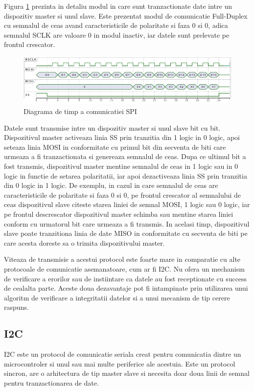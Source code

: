 Figura \ref{fig:SPITimingDiagram} prezinta in detaliu modul in care sunt tranzactionate date intre un dispozitiv master si unul slave. Este prezentat modul de 
comunicatie Full-Duplex cu semnalul de ceas avand caracteristicile de polaritate si faza 0 si 0, adica semnalul SCLK are valoare 0 in modul inactiv, iar datele 
sunt prelevate pe frontul crescator.
\begin{figure}[H]
    \centering
    \includegraphics[scale=0.75]{figs/SPITimingDiagram.png}
    \caption{Diagrama de timp a comunicatiei SPI}
    \label{fig:SPITimingDiagram}
\end{figure}

Datele sunt transmise intre un dispozitiv master si unul slave bit cu bit. Dispozitivul master activeaza linia SS prin tranzitia din 1 logic in 0 logic, 
apoi seteaza linia MOSI in conformitate cu primul bit din secventa de biti care urmeaza a fi tranzactionata si genereaza semnalul de ceas. Dupa ce ultimul 
bit a fost transmis, dispozitivul master mentine semnalul de ceas in 1 logic sau in 0 logic in functie de setarea polaritatii, iar apoi dezactiveaza linia 
SS prin tranzitia din 0 logic in 1 logic. De exemplu, in cazul in care semnalul de ceas are caracteristicile de polaritate si faza 0 si 0, pe frontul 
crescator al semnalului de ceas dispozitivul slave citeste starea liniei de semnal MOSI, 1 logic sau 0 logic, iar pe frontul descrescator dispozitivul master 
schimba sau mentine starea liniei conform cu urmatorul bit care urmeaza a fi transmis. In acelasi timp, dispozitivul slave poate tranzitiona linia de date MISO 
in conformitate cu secventa de biti pe care acesta doreste sa o trimita dispozitivului master.

Viteaza de transmisie a acestui protocol este foarte mare in comparatie cu alte protocoale de comunicatie asemanatoare, cum ar fi I2C. Nu ofera un mechanism 
de verificare a erorilor sau de instiintare ca datele au fost receptionate cu success de cealalta parte. Aceste doua dezavantaje pot fi intampinate prin 
utilizarea unui algoritm de verificare a integritatii datelor si a unui mecanism de tip cerere raspuns.

\subsection{I2C}\label{sec:i2c}
I2C este un protocol de comunicatie seriala creat pentru comunicatia dintre un microcontroler si unul sau mai multe periferice ale acestuia. Este un 
protocol sincron, are o arhitectura de tip master slave si necesita doar doua linii de semnal pentru tranzactionarea de date. 

